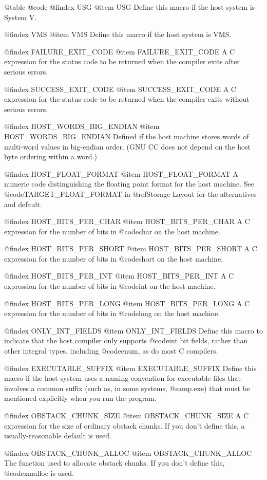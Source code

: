 @table @code
@findex USG
@item USG
Define this macro if the host system is System V.

@findex VMS
@item VMS
Define this macro if the host system is VMS.

@findex FAILURE_EXIT_CODE
@item FAILURE_EXIT_CODE
A C expression for the status code to be returned when the compiler
exits after serious errors.

@findex SUCCESS_EXIT_CODE
@item SUCCESS_EXIT_CODE
A C expression for the status code to be returned when the compiler
exits without serious errors.

@findex HOST_WORDS_BIG_ENDIAN
@item HOST_WORDS_BIG_ENDIAN
Defined if the host machine stores words of multi-word values in
big-endian order.  (GNU CC does not depend on the host byte ordering
within a word.)

@findex HOST_FLOAT_FORMAT
@item HOST_FLOAT_FORMAT
A numeric code distinguishing the floating point format for the host
machine.  See @code{TARGET_FLOAT_FORMAT} in @ref{Storage Layout} for the
alternatives and default.

@findex HOST_BITS_PER_CHAR
@item HOST_BITS_PER_CHAR
A C expression for the number of bits in @code{char} on the host
machine.

@findex HOST_BITS_PER_SHORT
@item HOST_BITS_PER_SHORT
A C expression for the number of bits in @code{short} on the host
machine.

@findex HOST_BITS_PER_INT
@item HOST_BITS_PER_INT
A C expression for the number of bits in @code{int} on the host
machine.

@findex HOST_BITS_PER_LONG
@item HOST_BITS_PER_LONG
A C expression for the number of bits in @code{long} on the host
machine.

@findex ONLY_INT_FIELDS
@item ONLY_INT_FIELDS
Define this macro to indicate that the host compiler only supports
@code{int} bit fields, rather than other integral types, including
@code{enum}, as do most C compilers.

@findex EXECUTABLE_SUFFIX
@item EXECUTABLE_SUFFIX
Define this macro if the host system uses a naming convention for
executable files that involves a common suffix (such as, in some
systems, @samp{.exe}) that must be mentioned explicitly when you run
the program.

@findex OBSTACK_CHUNK_SIZE
@item OBSTACK_CHUNK_SIZE
A C expression for the size of ordinary obstack chunks.
If you don't define this, a usually-reasonable default is used.

@findex OBSTACK_CHUNK_ALLOC
@item OBSTACK_CHUNK_ALLOC
The function used to allocate obstack chunks.
If you don't define this, @code{xmalloc} is used.

